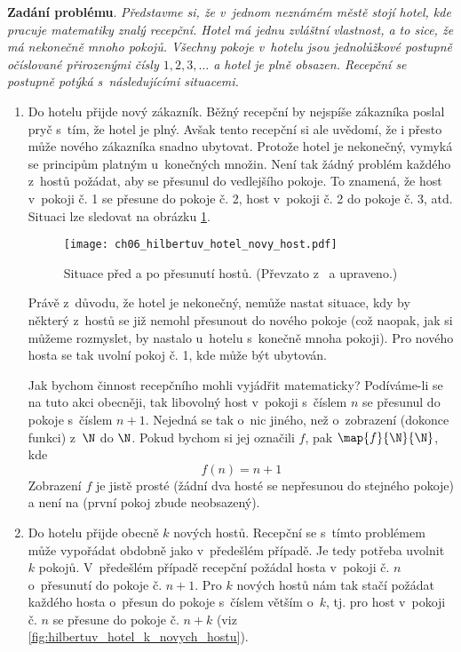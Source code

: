 \noindent\textbf{Zadání problému}. \textit{Představme si, že v~jednom neznámém městě stojí hotel, kde pracuje matematiky znalý recepční. Hotel má jednu zvláštní vlastnost, a to sice, že má nekonečně mnoho pokojů. Všechny pokoje v~hotelu jsou jednolůžkové postupně očíslované přirozenými čísly $1,2,3,\dots$ a hotel je plně obsazen. Recepční se postupně potýká s~následujícími situacemi.}
\begin{enumerate}[label=\textit{(\roman*)}]
    \item\label{item:novy_host} Do hotelu přijde nový zákazník. Běžný recepční by nejspíše zákazníka poslal pryč s~tím, že hotel je plný. Avšak tento recepční si ale uvědomí, že i přesto může nového zákazníka snadno ubytovat. Protože hotel je nekonečný, vymyká se principům platným u~konečných množin. Není tak žádný problém každého z~hostů požádat, aby se přesunul do vedlejšího pokoje. To znamená, že host v~pokoji č. 1 se přesune do pokoje č. 2, host v~pokoji č. 2 do pokoje č. 3, atd. Situaci lze sledovat na obrázku \ref{fig:hilbertuv_hotel_novy_host}.
    \begin{figure}[h]
        \centering
        \texttt{[image: ch06\_hilbertuv\_hotel\_novy\_host.pdf]}
        \caption{Situace před a po přesunutí hostů. (Převzato z~\cite{Rmoutil2022} a upraveno.)}
        \label{fig:hilbertuv_hotel_novy_host}
    \end{figure}
    Právě z~důvodu, že hotel je nekonečný, nemůže nastat situace, kdy by některý z~hostů se již nemohl přesunout do nového pokoje (což naopak, jak si můžeme rozmyslet, by nastalo u~hotelu s~konečně mnoha pokoji). Pro nového hosta se tak uvolní pokoj č. 1, kde může být ubytován.\par
    Jak bychom činnost recepčního mohli vyjádřit matematicky? Podíváme-li se na tuto akci obecněji, tak libovolný host v~pokoji s~číslem $n$ se přesunul do pokoje s~číslem $n+1$. Nejedná se tak o~nic jiného, než o~zobrazení (dokonce funkci) z~$\N$ do $\N$. Pokud bychom si jej označili $f$, pak $\map{f}{\N}{\N}$, kde
    \begin{equation*}
        f(n)=n+1
    \end{equation*}
    Zobrazení $f$ je jistě prosté (žádní dva hosté se nepřesunou do stejného pokoje) a není na (první pokoj zbude neobsazený).
    \item\label{item:k_novych_hostu} Do hotelu přijde obecně $k$ nových hostů. Recepční se s~tímto problémem může vypořádat obdobně jako v~předešlém případě. Je tedy potřeba uvolnit $k$ pokojů. V~předešlém případě recepční požádal hosta v~pokoji č. $n$ o~přesunutí do pokoje č. $n+1$. Pro $k$ nových hostů nám tak stačí požádat každého hosta o~přesun do pokoje s~číslem větším o~$k$, tj. pro host v~pokoji č. $n$ se přesune do pokoje č. $n+k$ (viz \ref{fig:hilbertuv_hotel_k_novych_hostu}).

\end{enumerate}
